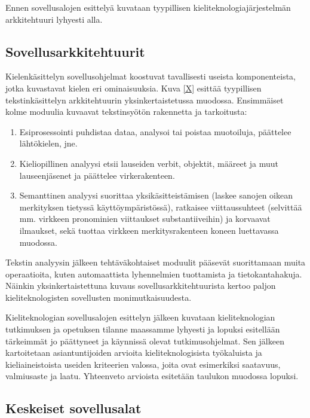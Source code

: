 \documentclass[]{../../metanetpaper}
\begin{document}
\begin{multicols}{2}
Ennen sovellusalojen esittelyä kuvataan tyypillisen
kieliteknologiajärjestelmän arkkitehtuuri lyhyesti alla.


\subsection{Sovellusarkkitehtuurit}


Kielenkäsittelyn sovellusohjelmat koostuvat tavallisesti useista
komponenteista, jotka kuvastavat kielen eri ominaisuuksia. Kuva
\ref{X} esittää tyypillisen tekstinkäsittelyn arkkitehtuurin
yksinkertaistetussa muodossa. Ensimmäiset kolme moduulia kuvaavat
tekstinsyötön rakennetta ja tarkoitusta:
\begin{enumerate}
\item Esiprosessointi puhdistaa dataa, analysoi tai poistaa muotoiluja,
 päättelee lähtökielen, jne.

\item Kieliopillinen analyysi etsii lauseiden verbit, objektit,
määreet ja muut lauseenjäsenet ja päättelee virkerakenteen.

\item Semanttinen analyysi suorittaa yksikäsitteistämisen (laskee
sanojen oikean merkityksen tietyssä käyttöympäristössä), ratkaisee
viittaussuhteet (selvittää mm. virkkeen pronominien viittaukset
substantiiveihin) ja korvaavat ilmaukset, sekä tuottaa virkkeen
merkitysrakenteen koneen luettavassa muodossa.
\end{enumerate}

Tekstin analyysin jälkeen tehtäväkohtaiset moduulit pääsevät
suorittamaan muita operaatioita, kuten automaattista lyhennelmien
tuottamista ja tietokantahakuja. Näinkin yksinkertaistettuna
kuvaus sovellusarkkitehtuurista kertoo paljon kieliteknologisten sovellusten 
monimutkaisuudesta.

Kieliteknologian sovellusalojen esittelyn jälkeen kuvataan kieliteknologian 
tutkimuksen ja opetuksen tilanne maassamme lyhyesti ja lopuksi esitellään 
tärkeimmät jo päättyneet ja käynnissä olevat tutkimusohjelmat. Sen jälkeen kartoitetaan
asiantuntijoiden arvioita kieliteknologisista työkaluista ja
kieliaineistoista useiden kriteerien valossa, joita ovat esimerkiksi
saatavuus, valmiusaste ja laatu. Yhteenveto arvioista esitetään
taulukon muodossa lopuksi.


\subsection{Keskeiset sovellusalat}



\end{multicols}
\end{document}
